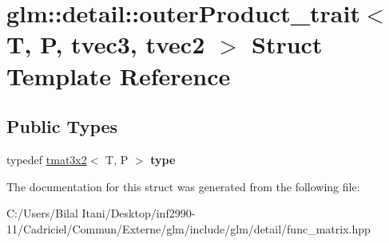 \hypertarget{structglm_1_1detail_1_1outer_product__trait_3_01_t_00_01_p_00_01tvec3_00_01tvec2_01_4}{}\section{glm\+:\+:detail\+:\+:outer\+Product\+\_\+trait$<$ T, P, tvec3, tvec2 $>$ Struct Template Reference}
\label{structglm_1_1detail_1_1outer_product__trait_3_01_t_00_01_p_00_01tvec3_00_01tvec2_01_4}
\subsection*{Public Types}
\begin{DoxyCompactItemize}
\item 
typedef \hyperlink{structglm_1_1detail_1_1tmat3x2}{tmat3x2}$<$ T, P $>$ {\bfseries type}\hypertarget{structglm_1_1detail_1_1outer_product__trait_3_01_t_00_01_p_00_01tvec3_00_01tvec2_01_4_a241608939fa083f2ddb7c701be75a732}{}\label{structglm_1_1detail_1_1outer_product__trait_3_01_t_00_01_p_00_01tvec3_00_01tvec2_01_4_a241608939fa083f2ddb7c701be75a732}

\end{DoxyCompactItemize}


The documentation for this struct was generated from the following file\+:\begin{DoxyCompactItemize}
\item 
C\+:/\+Users/\+Bilal Itani/\+Desktop/inf2990-\/11/\+Cadriciel/\+Commun/\+Externe/glm/include/glm/detail/func\+\_\+matrix.\+hpp\end{DoxyCompactItemize}
